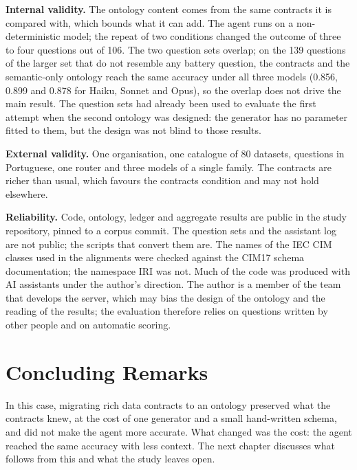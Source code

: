\textbf{Internal validity.} The ontology content comes from the same contracts it is
compared with, which bounds what it can add. The agent runs on a non-deterministic model; the
repeat of two conditions changed the outcome of three to four questions out of 106. The two
question sets overlap; on the 139 questions of the larger set that do not resemble any
battery question, the contracts and the semantic-only ontology reach the same accuracy under
all three models (0.856, 0.899 and 0.878 for Haiku, Sonnet and Opus), so the overlap does
not drive the main result. The question sets had already been used to evaluate the first attempt when the second
ontology was designed: the generator has no parameter fitted to them, but the design was
not blind to those results.

\textbf{External validity.} One organisation, one catalogue of 80 datasets, questions in
Portuguese, one router and three models of a single family. The contracts are richer than usual, which favours the
contracts condition and may not hold elsewhere.

\textbf{Reliability.} Code, ontology, ledger and aggregate results are public in the study
repository, pinned to a corpus commit. The question sets and the assistant log are not
public; the scripts that convert them are. The names of the IEC CIM classes used in the
alignments were checked against the CIM17 schema documentation; the namespace IRI was not. Much of the code was produced with AI assistants under the author's
direction. The author is a member of the team that develops the server, which may bias the
design of the ontology and the reading of the results; the evaluation therefore relies on
questions written by other people and on automatic scoring.

\section{Concluding Remarks}
In this case, migrating rich data contracts to an ontology preserved what the contracts
knew, at the cost of one generator and a small hand-written schema, and did not make the
agent more accurate. What changed was the cost: the agent reached the same accuracy with
less context. The next chapter discusses what follows from this and what the study leaves
open.
